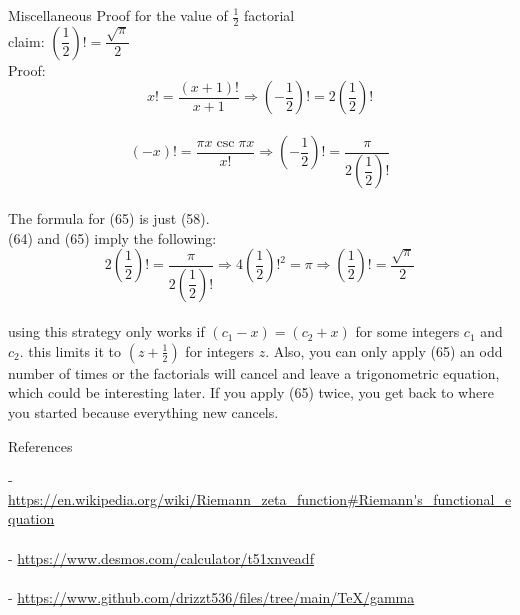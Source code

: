 \documentclass[12pt]{article}
\begin{document}
\begin{section}{Miscellaneous}
	\noindent Proof for the value of $\frac12$ factorial\\
	claim: $\left(\dfrac12\right)!=\dfrac{\sqrt\pi}2$\\
	Proof:\\
	\begin{equation}
		x!=\dfrac{(x+1)!}{x+1}\Longrightarrow\left(-\dfrac12\right)!=2\left(\dfrac12\right)!
	\end{equation}\\
	\begin{equation}
		(-x)!=\dfrac{\pi x\csc\pi x}{x!}\Longrightarrow\left(-\dfrac12\right)!=\dfrac\pi{2\left(\dfrac12\right)!}
	\end{equation}\\
	The formula for (65) is just (58).\\
	(64) and (65) imply the following:\\
	\begin{equation}
		2\left(\dfrac12\right)!=\dfrac\pi{2\left(\dfrac12\right)!}\Longrightarrow4\left(\dfrac12\right)!^2=\pi\Longrightarrow\left(\dfrac12\right)!=\dfrac{\sqrt\pi}2
	\end{equation}\\
	using this strategy only works if $(c_1-x)=(c_2+x)$ for some integers $c_1$ and $c_2$. this limits it to $(z+\frac12)$ for integers $z$. Also, you can only apply (65) an odd number of times or the factorials will cancel and leave a trigonometric equation, which could be interesting later. If you apply (65) twice, you get back to where you started because everything new cancels.\\
	\blacksquare
\end{section}

\pagebreak\begin{section}{References}

	\noindent- \url{https://en.wikipedia.org/wiki/Riemann\_zeta\_function\#Riemann's\_functional\_equation}\\
	\indent{}\\

	\noindent- \url{https://www.desmos.com/calculator/t51xnveadf}\\
	\indent{}\\

	\noindent- \url{https://www.github.com/drizzt536/files/tree/main/TeX/gamma}\\
	\indent{}
\end{section}
\end{document}
